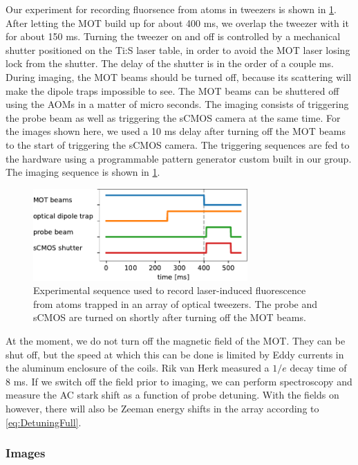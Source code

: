 Our experiment for recording fluorsence from atoms in tweezers is shown in \cref{fig:Sequence}.
After letting the MOT build up for about 400 ms, we overlap the tweezer with it for about 150 ms.
Turning the tweezer on and off is controlled by a mechanical shutter positioned on the \ac{Ti:S} laser table, in order to avoid the MOT laser losing lock from the shutter.
The delay of the shutter is in the order of a couple ms. 
During imaging, the MOT beams should be turned off, because its scattering will make the dipole traps impossible to see. 
The MOT beams can be shuttered off using the \ac{AOM}s in a matter of micro seconds. 
The imaging consists of triggering the probe beam as well as triggering the sCMOS camera at the same time. 
For the images shown here, we used a 10 ms delay after turning off the MOT beams to the start of triggering the sCMOS camera. 
The triggering sequences are fed to the hardware using a programmable pattern generator custom built in our group. 
The imaging sequence is shown in \cref{fig:Sequence}.
\begin{figure}
    \centering
    \includegraphics[width=0.73\textwidth]{figures/Sequence.pdf}
    \caption{Experimental sequence used to record laser-induced fluorescence from atoms trapped in an array of optical tweezers.
    The probe and sCMOS are turned on shortly after turning off the MOT beams. }
    \label{fig:Sequence}
\end{figure}
At the moment, we do not turn off the magnetic field of the MOT.
They can be shut off, but the speed at which this can be done is limited by Eddy currents in the aluminum enclosure of the coils. 
Rik van Herk measured a $1/e$ decay time of 8 ms.
If we switch off the field prior to imaging, we can perform spectroscopy and measure the AC stark shift as a function of probe detuning. 
With the fields on however, there will also be Zeeman energy shifts in the array according to \cref{eq:DetuningFull}. 

\subsubsection*{Images}

